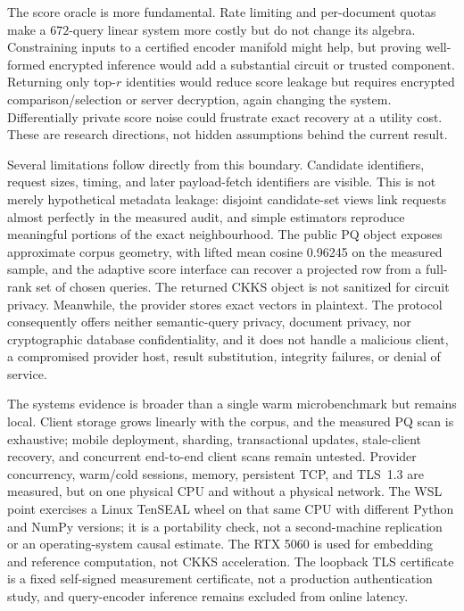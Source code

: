 \documentclass[pdflatex,sn-basic,Numbered]{sn-jnl}
\theoremstyle{plain}
\begin{document}
The score oracle is more fundamental. Rate limiting and per-document quotas make a $672$-query linear system more costly but do not change its algebra. Constraining inputs to a certified encoder manifold might help, but proving well-formed encrypted inference would add a substantial circuit or trusted component. Returning only top-$r$ identities would reduce score leakage but requires encrypted comparison/selection or server decryption, again changing the system. Differentially private score noise could frustrate exact recovery at a utility cost. These are research directions, not hidden assumptions behind the current result.

Several limitations follow directly from this boundary. Candidate identifiers, request sizes, timing, and later payload-fetch identifiers are visible. This is not merely hypothetical metadata leakage: disjoint candidate-set views link requests almost perfectly in the measured audit, and simple estimators reproduce meaningful portions of the exact neighbourhood. The public PQ object exposes approximate corpus geometry, with lifted mean cosine 0.96245 on the measured sample, and the adaptive score interface can recover a projected row from a full-rank set of chosen queries. The returned CKKS object is not sanitized for circuit privacy. Meanwhile, the provider stores exact vectors in plaintext. The protocol consequently offers neither semantic-query privacy, document privacy, nor cryptographic database confidentiality, and it does not handle a malicious client, a compromised provider host, result substitution, integrity failures, or denial of service.

The systems evidence is broader than a single warm microbenchmark but remains local. Client storage grows linearly with the corpus, and the measured PQ scan is exhaustive; mobile deployment, sharding, transactional updates, stale-client recovery, and concurrent end-to-end client scans remain untested. Provider concurrency, warm/cold sessions, memory, persistent TCP, and TLS~1.3 are measured, but on one physical CPU and without a physical network. The WSL point exercises a Linux TenSEAL wheel on that same CPU with different Python and NumPy versions; it is a portability check, not a second-machine replication or an operating-system causal estimate. The RTX 5060 is used for embedding and reference computation, not CKKS acceleration. The loopback TLS certificate is a fixed self-signed measurement certificate, not a production authentication study, and query-encoder inference remains excluded from online latency.
\end{document}
